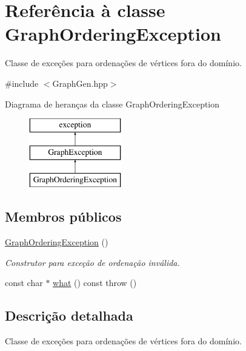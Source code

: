 \hypertarget{classGraphOrderingException}{}\section{Referência à classe Graph\+Ordering\+Exception}
\label{classGraphOrderingException}


Classe de exceções para ordenações de vértices fora do domínio.  




{\ttfamily \#include $<$Graph\+Gen.\+hpp$>$}

Diagrama de heranças da classe Graph\+Ordering\+Exception\begin{figure}[H]
\begin{center}
\leavevmode
\includegraphics[height=3.000000cm]{classGraphOrderingException}
\end{center}
\end{figure}
\subsection*{Membros públicos}
\begin{DoxyCompactItemize}
\item 
\mbox{\label{classGraphOrderingException_ac24ad9d03e3be6a3c2c43d233413412f}} 
\hyperlink{classGraphOrderingException_ac24ad9d03e3be6a3c2c43d233413412f}{Graph\+Ordering\+Exception} ()
\begin{DoxyCompactList}\small\item\em Construtor para exceção de ordenação inválida. \end{DoxyCompactList}\item 
const char $\ast$ \hyperlink{classGraphOrderingException_a38d6f4e461cd40c0d2e8c07e7a5d6bef}{what} () const  throw ()
\end{DoxyCompactItemize}


\subsection{Descrição detalhada}
Classe de exceções para ordenações de vértices fora do domínio. 

